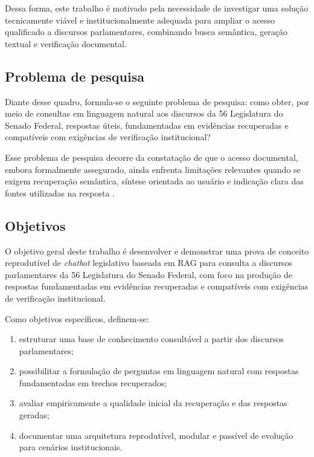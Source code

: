 Dessa forma, este trabalho é motivado pela necessidade de investigar uma solução tecnicamente viável e institucionalmente adequada para ampliar o acesso qualificado a discursos parlamentares, combinando busca semântica, geração textual e verificação documental.

\subsection{Problema de pesquisa}

Diante desse quadro, formula-se o seguinte problema de pesquisa: como obter, por meio de consultas em linguagem natural aos discursos da 56\textordfeminine{} Legislatura do Senado Federal, respostas úteis, fundamentadas em evidências recuperadas e compatíveis com exigências de verificação institucional?

Esse problema de pesquisa decorre da constatação de que o acesso documental, embora formalmente assegurado, ainda enfrenta limitações relevantes quando se exigem recuperação semântica, síntese orientada ao usuário e indicação clara das fontes utilizadas na resposta \parencite{bandeiraBernardes2016information,geunis2023parliamentaryMonitoring,gao2023ragSurvey}.

\subsection{Objetivos}

O objetivo geral deste trabalho é desenvolver e demonstrar uma prova de conceito reprodutível de \textit{chatbot} legislativo baseada em RAG para consulta a discursos parlamentares da 56\textordfeminine{} Legislatura do Senado Federal, com foco na produção de respostas fundamentadas em evidências recuperadas e compatíveis com exigências de verificação institucional.

Como objetivos específicos, definem-se:
\begin{enumerate}
  \item estruturar uma base de conhecimento consultável a partir dos discursos parlamentares;
  \item possibilitar a formulação de perguntas em linguagem natural com respostas fundamentadas em trechos recuperados;
  \item avaliar empiricamente a qualidade inicial da recuperação e das respostas geradas;
  \item documentar uma arquitetura reprodutível, modular e passível de evolução para cenários institucionais.
\end{enumerate}

